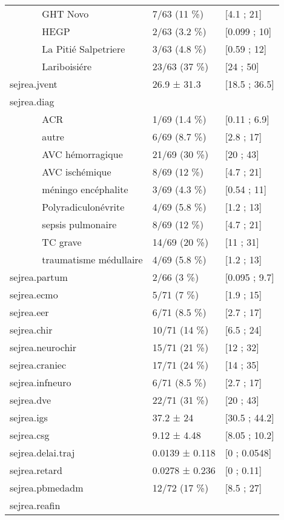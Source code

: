 \documentclass[]{article}
\begin{document}
\begin{longtable}{lll}
  ~~~~~~ GHT Novo & 7/63 (11 \%) &  [4.1 ; 21] \\ 
  ~~~~~~ HEGP & 2/63 (3.2 \%) &  [0.099 ; 10] \\ 
  ~~~~~~ La Pitié Salpetriere  & 3/63 (4.8 \%) &  [0.59 ; 12] \\ 
  ~~~~~~ Lariboisiére & 23/63 (37 \%) &  [24 ; 50] \\ 
  sejrea.jvent & 26.9 ± 31.3 & [18.5 ; 36.5] \\ 
  sejrea.diag &   &   \\ 
  ~~~~~~ ACR & 1/69 (1.4 \%) &  [0.11 ; 6.9] \\ 
  ~~~~~~ autre & 6/69 (8.7 \%) &  [2.8 ; 17] \\ 
  ~~~~~~ AVC hémorragique & 21/69 (30 \%) &  [20 ; 43] \\ 
  ~~~~~~ AVC ischémique & 8/69 (12 \%) &  [4.7 ; 21] \\ 
  ~~~~~~ méningo encéphalite & 3/69 (4.3 \%) &  [0.54 ; 11] \\ 
  ~~~~~~ Polyradiculonévrite & 4/69 (5.8 \%) &  [1.2 ; 13] \\ 
  ~~~~~~ sepsis pulmonaire & 8/69 (12 \%) &  [4.7 ; 21] \\ 
  ~~~~~~ TC grave & 14/69 (20 \%) &  [11 ; 31] \\ 
  ~~~~~~ traumatisme médullaire & 4/69 (5.8 \%) &  [1.2 ; 13] \\ 
  sejrea.partum & 2/66 (3 \%) &  [0.095 ; 9.7] \\ 
  sejrea.ecmo & 5/71 (7 \%) &  [1.9 ; 15] \\ 
  sejrea.eer & 6/71 (8.5 \%) &  [2.7 ; 17] \\ 
  sejrea.chir & 10/71 (14 \%) &  [6.5 ; 24] \\ 
  sejrea.neurochir & 15/71 (21 \%) &  [12 ; 32] \\ 
  sejrea.craniec & 17/71 (24 \%) &  [14 ; 35] \\ 
  sejrea.infneuro & 6/71 (8.5 \%) &  [2.7 ; 17] \\ 
  sejrea.dve & 22/71 (31 \%) &  [20 ; 43] \\ 
  sejrea.igs & 37.2 ± 24 & [30.5 ; 44.2] \\ 
  sejrea.csg & 9.12 ± 4.48 & [8.05 ; 10.2] \\ 
  sejrea.delai.traj & 0.0139 ± 0.118 & [0 ; 0.0548] \\ 
  sejrea.retard & 0.0278 ± 0.236 & [0 ; 0.11] \\ 
  sejrea.pbmedadm & 12/72 (17 \%) &  [8.5 ; 27] \\ 
  sejrea.reafin &   &   \\ 

\end{longtable}
\end{document}
